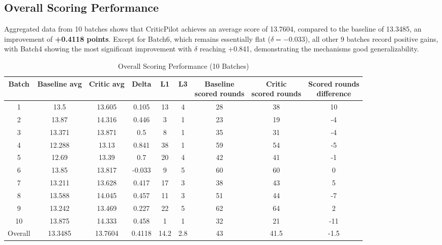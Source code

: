 \documentclass[UTF8]{article} %
\begin{document}
\subsection{Overall Scoring Performance}\label{overall-scoring-performance}

Aggregated data from 10 batches shows that CriticPilot achieves an
average score of 13.7604, compared to the baseline of 13.3485, an
improvement of \textbf{+0.4118 points}. Except for Batch6, which remains
essentially flat ($\delta = -0.033$), all other 9 batches record positive
gains, with Batch4 showing the most significant improvement with $ \delta $
reaching +0.841, demonstrating the mechanism\textquotesingle s good
generalizability.

\begin{table}[htbp]
\scriptsize
\centering
\caption{Overall Scoring Performance (10 Batches)}
\label{tab:comparison}
\begin{tabular}{|c|c|c|c|c|c|c|c|c|}
\hline
Batch & Baseline avg & Critic avg & Delta & L1 & L3 
& \makecell{Baseline \\ scored rounds} & \makecell{Critic \\ scored rounds} & \makecell{Scored rounds \\ difference} \\
\hline
1 & 13.5 & 13.605 & 0.105 & 13 & 4 & 28 & 38 & 10 \\
\hline
2 & 13.87 & 14.316 & 0.446 & 3 & 1 & 23 & 19 & -4 \\
\hline
3 & 13.371 & 13.871 & 0.5 & 8 & 1 & 35 & 31 & -4 \\
\hline
4 & 12.288 & 13.13 & 0.841 & 38 & 1 & 59 & 54 & -5 \\
\hline
5 & 12.69 & 13.39 & 0.7 & 20 & 4 & 42 & 41 & -1 \\
\hline
6 & 13.85 & 13.817 & -0.033 & 9 & 5 & 60 & 60 & 0 \\
\hline
7 & 13.211 & 13.628 & 0.417 & 17 & 3 & 38 & 43 & 5 \\
\hline
8 & 13.588 & 14.045 & 0.457 & 11 & 3 & 51 & 44 & -7 \\
\hline
9 & 13.242 & 13.469 & 0.227 & 22 & 5 & 62 & 64 & 2 \\
\hline
10 & 13.875 & 14.333 & 0.458 & 1 & 1 & 32 & 21 & -11 \\
\hline
\hline
Overall & 13.3485 & 13.7604 & 0.4118 & 14.2 & 2.8 & 43 & 41.5 & -1.5 \\
\hline
\end{tabular}
\end{table}
\end{document}
